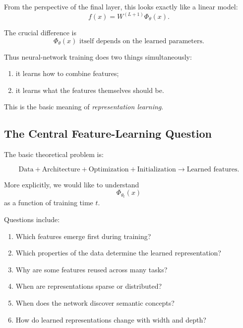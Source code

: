 From the perspective of the final layer, this looks exactly like a linear
model:
\begin{equation}
    f(x)
    =
    W^{(L+1)}
    \Phi_\theta(x).
\end{equation}

The crucial difference is
\begin{equation}
    \boxed{
    \Phi_\theta(x)
    \text{ itself depends on the learned parameters.}
    }
\end{equation}

Thus neural-network training does two things simultaneously:
\begin{enumerate}
    \item it learns how to combine features;
    \item it learns what the features themselves should be.
\end{enumerate}

This is the basic meaning of \emph{representation learning}.


\subsection{The Central Feature-Learning Question}

The basic theoretical problem is:

\begin{equation}
    \boxed{
    \text{Data}
    +
    \text{Architecture}
    +
    \text{Optimization}
    +
    \text{Initialization}
    \rightarrow
    \text{Learned features}.
    }
\end{equation}

More explicitly, we would like to understand
\begin{equation}
    \Phi_{\theta_t}(x)
\end{equation}
as a function of training time $t$.

Questions include:
\begin{enumerate}
    \item Which features emerge first during training?
    \item Which properties of the data determine the learned representation?
    \item Why are some features reused across many tasks?
    \item When are representations sparse or distributed?
    \item When does the network discover semantic concepts?
    \item How do learned representations change with width and depth?
\end{enumerate}


